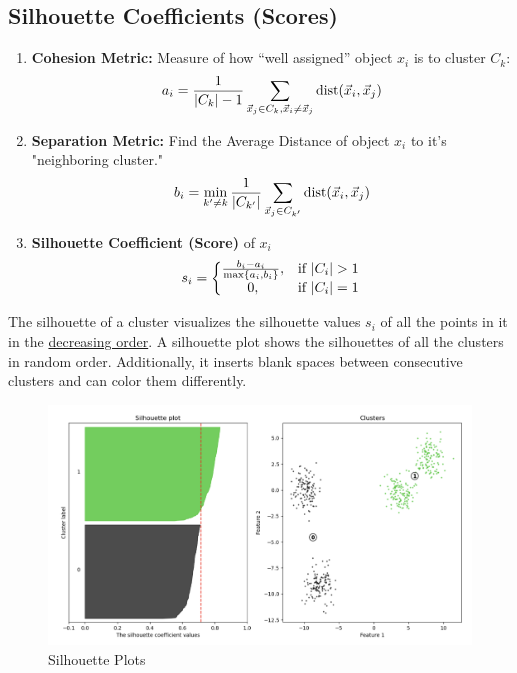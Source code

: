 \documentclass[11pt]{elegantbook}
\begin{document}
\subsection{Silhouette Coefficients (Scores)}
\begin{enumerate}
    \item \textbf{Cohesion Metric:} Measure of how “well assigned” object $x_i$ is to cluster $C_k$: $$a_i=\frac{1}{|C_k|-1}\sum_{\vec{x}_j\in C_k,\vec{x}_i\neq \vec{x}_j}\textnormal{dist}(\vec{x}_i,\vec{x}_j)$$
    \item \textbf{Separation Metric:} Find the Average Distance of object $x_i$ to it's "neighboring cluster." $$b_i=\min_{k'\neq k}\frac{1}{|C_{k'}|}\sum_{\vec{x}_j\in C_{k'}}\textnormal{dist}(\vec{x}_i,\vec{x}_j)$$
    \item \textbf{Silhouette Coefficient (Score)} of $x_i$
    $$s_i=\left\{\begin{matrix}
        \frac{b_i-a_i}{\max\{a_i,b_i\}},&\textnormal{if }|C_i|>1\\
        0,&\textnormal{if }|C_i|=1
    \end{matrix}\right.$$
\end{enumerate}
The silhouette of a cluster visualizes the silhouette values $s_i$ of all the points in it in the \underline{decreasing order}. A silhouette plot shows the silhouettes of all the clusters in random order. Additionally, it inserts blank spaces between consecutive clusters and can color them differently.
\begin{center}\begin{figure}[htbp]
    \centering
    \includegraphics[scale=0.2]{Silhouette Plots.png}
    \caption{Silhouette Plots}
    \label{}
\end{figure}\end{center}
\end{document}
